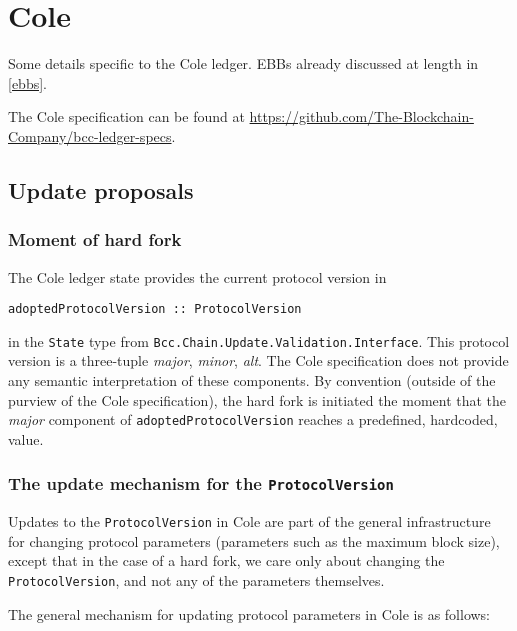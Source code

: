 \chapter{Cole}

Some details specific to the Cole ledger.
EBBs already discussed at length in \cref{ebbs}.

The Cole specification can be found at \url{https://github.com/The-Blockchain-Company/bcc-ledger-specs}.

\section{Update proposals}
\label{cole:hardfork}

\subsection{Moment of hard fork}
\label{cole:hardfork:moment}

The Cole ledger state provides the current protocol version in
%
\begin{lstlisting}
adoptedProtocolVersion :: ProtocolVersion
\end{lstlisting}
%
in the \lstinline!State! type from
\lstinline!Bcc.Chain.Update.Validation.Interface!.
This protocol version is a three-tuple \emph{major}, \emph{minor}, \emph{alt}.
The Cole specification does not provide any semantic interpretation of these
components. By convention (outside of the purview of the Cole specification),
the hard fork is initiated the moment that the \emph{major} component of
\lstinline!adoptedProtocolVersion! reaches a predefined, hardcoded, value.

\subsection{The update mechanism for the \lstinline!ProtocolVersion!}

Updates to the \lstinline!ProtocolVersion! in Cole are part of the general
infrastructure for changing protocol parameters (parameters such as the maximum
block size), except that in the case of a hard fork, we care only about changing
the \lstinline!ProtocolVersion!, and not any of the parameters themselves.

The general mechanism for updating protocol parameters in Cole is as follows:

